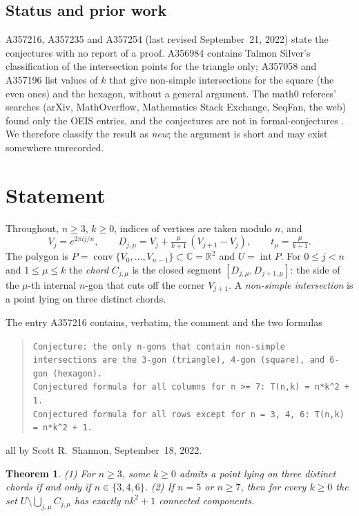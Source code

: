 \documentclass[11pt]{amsart}
\theoremstyle{plain}
\newtheorem{theorem}{Theorem}
\theoremstyle{definition}
\newcommand{\C}{\mathbb{C}}
\begin{document}
\subsection*{Status and prior work}
A357216, A357235 and A357254 (last revised September~21, 2022) state the conjectures with no report of a proof. A356984 contains Talmon Silver's classification of the intersection points for the triangle only; A357058 and A357196 list values of $k$ that give non-simple intersections for the square (the even ones) and the hexagon, without a general argument. The math0 referees' searches (arXiv, MathOverflow, Mathematics Stack Exchange, SeqFan, the web) found only the OEIS entries, and the conjectures are not in formal-conjectures \cite{FC}. We therefore classify the result as \emph{new}; the argument is short and may exist somewhere unrecorded.

\section{Statement}\label{sec:statement}

Throughout, $n\ge3$, $k\ge0$, indices of vertices are taken modulo $n$, and
\[
V_j=e^{2\pi i j/n},\qquad D_{j,\mu}=V_j+\tfrac{\mu}{k+1}\,(V_{j+1}-V_j),\qquad t_\mu=\tfrac{\mu}{k+1}.
\]
The polygon is $P=\operatorname{conv}\{V_0,\dots,V_{n-1}\}\subset\C=\mathbb{R}^2$ and $U=\operatorname{int}P$. For $0\le j<n$ and $1\le\mu\le k$ the \emph{chord} $C_{j,\mu}$ is the closed segment $[D_{j,\mu},D_{j+1,\mu}]$: the side of the $\mu$-th internal $n$-gon that cuts off the corner $V_{j+1}$. A \emph{non-simple intersection} is a point lying on three distinct chords.

The entry A357216 contains, verbatim, the comment and the two formulas
\begin{quote}\footnotesize
\texttt{Conjecture: the only n-gons that contain non-simple intersections are the 3-gon (triangle), 4-gon (square), and 6-gon (hexagon).}\\
\texttt{Conjectured formula for all columns for n >= 7: T(n,k) = n*k\^{}2 + 1.}\\
\texttt{Conjectured formula for all rows except for n = 3, 4, 6: T(n,k) = n*k\^{}2 + 1.}
\end{quote}
all by Scott R.~Shannon, September~18, 2022.

\begin{theorem}\label{thm:main}
(1) For $n\ge3$, some $k\ge0$ admits a point lying on three distinct chords if and only if $n\in\{3,4,6\}$.
(2) If $n=5$ or $n\ge7$, then for every $k\ge0$ the set $U\setminus\bigcup_{j,\mu}C_{j,\mu}$ has exactly $nk^2+1$ connected components.
\end{theorem}
\end{document}
